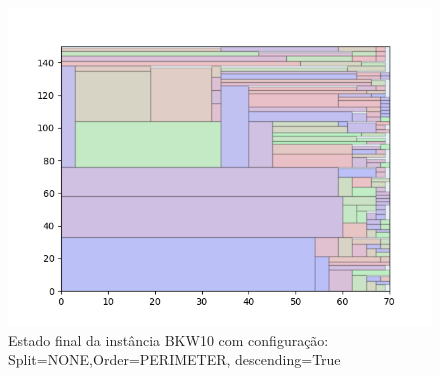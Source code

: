 \begin{figure}[H]
    \centering
    \caption[]{Estado final da instância BKW10 com configuração: Split=NONE,Order=PERIMETER, descending=True}
    \label{fig:bkw10-none-perimeter-true}
    \includegraphics[scale=0.5]{output/figures/bkw/bkw10/none/perimeter/true/000}
\end{figure}
